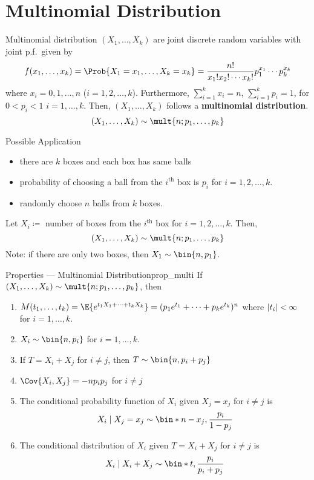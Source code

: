 \section{Multinomial Distribution}
\begin{Definition}{Multinomial distribution}{}
    $ (X_1,\ldots,X_k) $ are joint discrete
    random variables with joint p.f.\ given by
    \[ f(x_1,\ldots,x_k)=\Prob{X_1=x_1,\ldots,X_k=x_k}=
        \frac{n!}{x_1!x_2!\cdots x_k!}p_1^{x_1}\cdots p_k^{x_k} \]
    where $ x_i=0,1,\ldots,n $ ($ i=1,2,\ldots,k $). Furthermore,
    $ \sum_{i=1}^{k}x_i=n $, $ \sum_{i=1}^{k} p_i=1 $,
    for $ 0<p_i<1 $ $ i=1,\ldots,k $. Then,
    $ (X_1,\ldots,X_k) $ follows a \textbf{multinomial distribution}.
    \[ (X_1,\ldots,X_k)\sim \mult{n;p_1,\ldots,p_k} \]
\end{Definition}
\begin{Example}{Possible Application}{}
    \begin{itemize}
        \item there are $ k $ boxes and each box
              has same balls
        \item probability of choosing a ball from the
              $ i^{\text{th}} $ box is $ p_i $ for $ i=1,2,\ldots,k $.
        \item randomly choose $ n $ balls from $ k $ boxes.
    \end{itemize}
    Let $ X_i\coloneq $ number of boxes from the
    $ i^{\text{th}} $ box for $ i=1,2,\ldots,k $. Then,
    \[ (X_1,\ldots,X_k) \sim \mult{n;p_1,\ldots,p_k} \]
    Note: if there are only two boxes, then $ X_1\sim \bin{n,p_1} $.
\end{Example}
\begin{Proposition}{Properties --- Multinomial Distribution}{prop_multi}
    If $ (X_1,\ldots,X_k) \sim \mult{n;p_1,\ldots,p_k} $, then
    \begin{enumerate}[label=(\arabic*)]
        \item\label{prop_multi1} $ M(t_1,\ldots,t_k)=\E{e^{t_1 X_1+\cdots+t_k X_k}}=
                  (p_1e^{t_1}+\cdots+p_k e^{t_k})^n $
              where $ \lvert t_i\rvert<\infty $ for $ i=1,\ldots,k $.
        \item\label{prop_multi2} $ X_i \sim \bin{n,p_i} $ for $ i=1,\ldots,k $.
        \item\label{prop_multi3} If $ T=X_i+X_j $ for $ i\neq j $, then
              $ T \sim \bin{n,p_i+p_j} $
        \item\label{prop_multi4} $ \Cov{X_i,X_j}=-n p_i p_j  $
              for $ i\neq j $
        \item\label{prop_multi5} The conditional probability
              function of $ X_i $ given $ X_j=x_j $ for $ i\neq j $ is
              \[ X_i\mid X_j=x_j \sim \bin*{n-x_j,
                      \frac{p_i}{1-p_j}} \]
        \item\label{prop_multi6} The conditional distribution of $ X_i $
              given $ T=X_i+X_j $ for $ i\neq j $ is
              \[ X_i\mid X_i+X_j \sim \bin*{t,\frac{p_i}{p_i+p_j} } \]
    \end{enumerate}
\end{Proposition}

